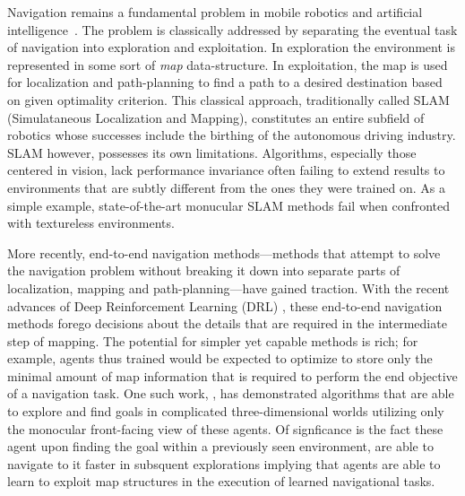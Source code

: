 
Navigation remains a fundamental problem in mobile robotics and artificial intelligence~\cite{SmChIJRR1986,ElCOMPUTER1980}.
The problem is classically addressed by separating the eventual task of navigation into exploration and exploitation. 
In exploration the environment is represented in some sort of \emph{map} data-structure. 
In exploitation, the map is used for localization and path-planning to find a path to a desired destination based on given optimality criterion. 
This classical approach, traditionally called SLAM (Simulataneous Localization and Mapping), constitutes an entire subfield of robotics whose successes include the birthing of the autonomous driving industry. 
SLAM however, possesses its own limitations. Algorithms, especially those centered in vision, lack performance invariance often failing to extend results to environments that are subtly different from the ones they were trained on. As a simple example, state-of-the-art monucular SLAM methods fail when confronted with textureless environments.

More recently, end-to-end navigation methods---methods that attempt to  
solve the navigation problem without breaking it down into separate parts of localization, mapping and path-planning---have gained traction.
%
With the recent advances of Deep Reinforcement Learning (DRL) \cite{MnKaSiNATURE2015}, these end-to-end navigation methods \cite{MnBaMiICML2016,SiHuMaNATURE2016,LePaKrISER2017,MiPaViICLR2017,OhChSiICML2016} forego decisions about the details that are required in the intermediate step of mapping.
The potential for simpler yet capable methods is rich; for example, agents thus trained would be expected to optimize to store only the minimal amount of map information that is required to perform the end objective of a navigation task.
One such work, \cite{MiPaViICLR2017}, has demonstrated algorithms that are able to explore and find goals in complicated three-dimensional worlds utilizing only the monocular front-facing view of these agents. Of signficance is the fact these agent upon finding the goal within a previously seen environment, are able to navigate to it faster in subsquent explorations implying that agents are able to learn to exploit map structures in the execution of learned navigational tasks. 

